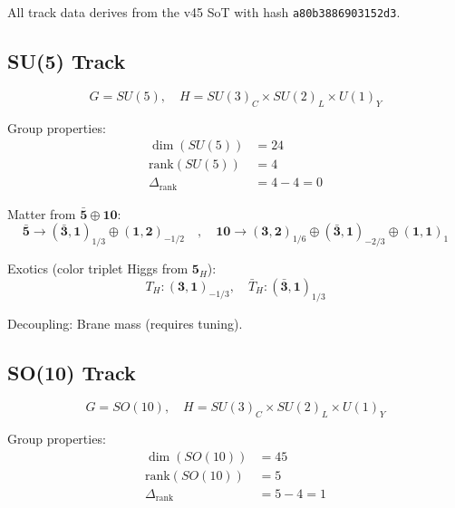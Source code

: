 \documentclass[11pt,a4paper]{article}
\begin{document}
All track data derives from the v45 SoT with hash \texttt{a80b3886903152d3}.

\subsection{SU(5) Track}
\label{subsec:su5-track}

\begin{equation}
\label{eq:su5-group}
G = SU(5), \quad H = SU(3)_C \times SU(2)_L \times U(1)_Y
\end{equation}

Group properties:
\begin{align}
\label{eq:su5-dim}
\dim(SU(5)) &= 24 \\
\label{eq:su5-rank}
\text{rank}(SU(5)) &= 4 \\
\label{eq:su5-rank-drop}
\Delta_{\text{rank}} &= 4 - 4 = 0
\end{align}

Matter from $\mathbf{\bar{5}} \oplus \mathbf{10}$:
\begin{equation}
\label{eq:su5-matter}
\mathbf{\bar{5}} \to (\bar{\mathbf{3}}, \mathbf{1})_{1/3} \oplus (\mathbf{1}, \mathbf{2})_{-1/2}
\quad,\quad
\mathbf{10} \to (\mathbf{3}, \mathbf{2})_{1/6} \oplus (\bar{\mathbf{3}}, \mathbf{1})_{-2/3} \oplus (\mathbf{1}, \mathbf{1})_{1}
\end{equation}

Exotics (color triplet Higgs from $\mathbf{5}_H$):
\begin{equation}
\label{eq:su5-exotics}
T_H : (\mathbf{3}, \mathbf{1})_{-1/3}, \quad \bar{T}_H : (\bar{\mathbf{3}}, \mathbf{1})_{1/3}
\end{equation}

Decoupling: Brane mass (requires tuning).

\subsection{SO(10) Track}
\label{subsec:so10-track}

\begin{equation}
\label{eq:so10-group}
G = SO(10), \quad H = SU(3)_C \times SU(2)_L \times U(1)_Y
\end{equation}

Group properties:
\begin{align}
\label{eq:so10-dim}
\dim(SO(10)) &= 45 \\
\label{eq:so10-rank}
\text{rank}(SO(10)) &= 5 \\
\label{eq:so10-rank-drop}
\Delta_{\text{rank}} &= 5 - 4 = 1
\end{align}
\end{document}
